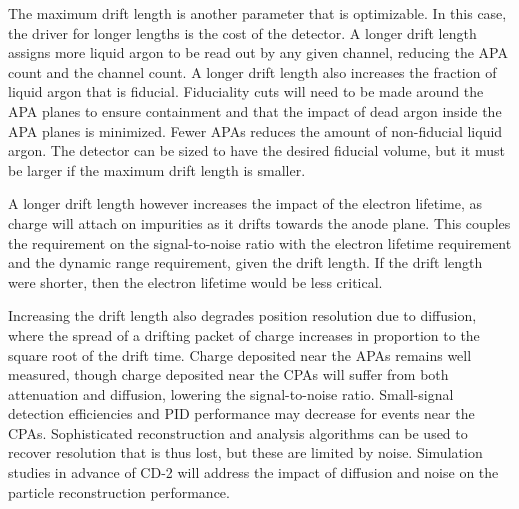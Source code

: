 The maximum drift length is another parameter that is optimizable.  In
this case, the driver for longer lengths is the cost of the detector.
A longer drift length assigns more liquid argon to be read out by any
given channel, reducing the APA count and the channel count.  A longer
drift length also increases the fraction of liquid argon that is
fiducial.  Fiduciality cuts will need to be made around the APA planes
to ensure containment and that the impact of dead argon inside the APA
planes is minimized.  Fewer APAs reduces the amount of non-fiducial
liquid argon.  The detector can be sized to have the desired fiducial
volume, but it must be larger if the maximum drift length is smaller.

A longer drift length however increases the impact of the electron
lifetime, 
as charge  will attach on impurities as it drifts towards the
anode plane.  This couples the requirement on the signal-to-noise
ratio with the electron lifetime requirement and the dynamic range
requirement, given the drift length.  If the drift length were
shorter, then the electron lifetime would be less critical. 

Increasing the drift length also degrades position resolution due to
diffusion, where the spread of a drifting packet of charge increases in
proportion to the square root of the drift time.  Charge deposited
near the APAs remains well measured, though charge deposited near the
CPAs will suffer from both attenuation and diffusion, lowering the
signal-to-noise ratio.  Small-signal detection efficiencies and PID
performance may decrease for events near the CPAs.
%
Sophisticated reconstruction and analysis algorithms can be used to
recover resolution that is thus lost, but these are limited by noise.
Simulation studies in advance of CD-2 will %
address the impact of
diffusion and noise on the particle reconstruction performance.

